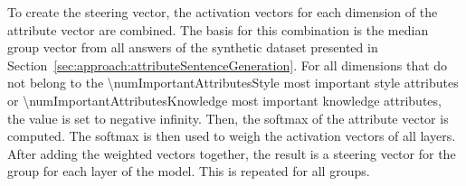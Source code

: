 To create the steering vector, the activation vectors for each dimension of the attribute vector are combined. The basis for this combination is the median group vector from all answers of the synthetic dataset presented in Section~\ref{sec:approach:attributeSentenceGeneration}. For all dimensions that do not belong to the \num{\numImportantAttributesStyle} most important style attributes or \num{\numImportantAttributesKnowledge} most important knowledge attributes, the value is set to negative infinity. Then, the softmax of the attribute vector is computed. The softmax is then used to weigh the activation vectors of all layers. After adding the weighted vectors together, the result is a steering vector for the group for each layer of the model. This is repeated for all groups.

